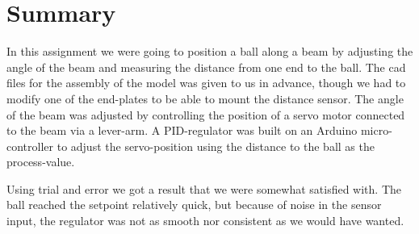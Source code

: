 \section{Summary}
In this assignment we were going to position a ball along a beam by adjusting the angle of the beam and measuring the distance from one end to the ball. The cad files for the assembly of the model was given to us in advance, though we had to modify one of the end-plates to be able to mount the distance sensor. The angle of the beam was adjusted by controlling the position of a servo motor connected to the beam via a lever-arm. A PID-regulator was built on an Arduino micro-controller to adjust the servo-position using the distance to the ball as the process-value.

Using trial and error we got a result that we were somewhat satisfied with. The ball reached the setpoint relatively quick, but because of noise in the sensor input, the regulator was not as smooth nor consistent as we would have wanted.